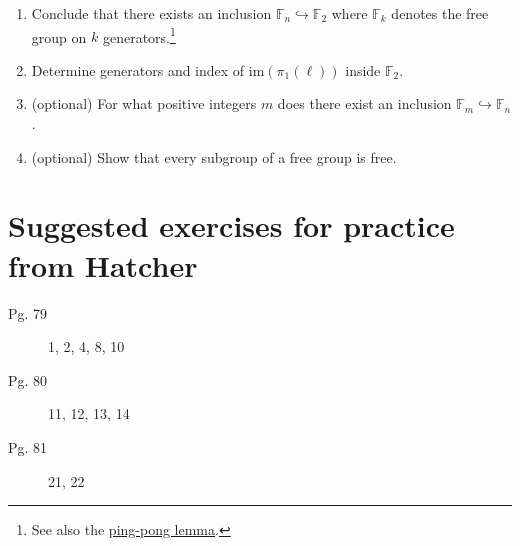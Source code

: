 \documentclass{article}
\begin{document}
\begin{enumerate}
\begin{enumerate}
  \item Conclude that there exists an
    inclusion $\mathbb{F}_n \hookrightarrow \mathbb{F}_2$ where $\mathbb{F}_k$ denotes the
    free group on $k$ generators.\footnote{See
      also the \href{https://en.wikipedia.org/wiki/Ping-pong_lemma}{ping-pong lemma}.}
  \item Determine generators and index of $\mathrm{im}(\pi_1(\ell))$ inside
    $\mathbb{F}_2$.
  \item (optional) For what positive integers $m$ does there exist an inclusion
    $\mathbb{F}_m \hookrightarrow \mathbb{F}_n$.
  \item (optional) Show that every subgroup of a free group is free.  \end{enumerate}
\end{enumerate}

\newpage
\section*{Suggested exercises for practice from Hatcher}

\begin{description}
\item[Pg. 79] 1, 2, 4, 8, 10
\item[Pg. 80] 11, 12, 13, 14
\item[Pg. 81] 21, 22 
\end{description}
\end{document}
